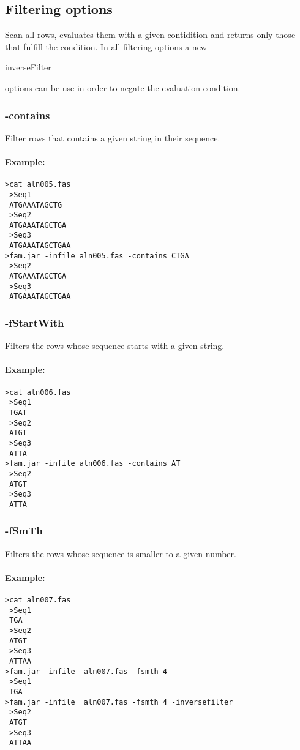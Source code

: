 \documentclass[a4paper, twoside,10pt]{article}
\begin{document}
\subsection{Filtering options}
Scan all rows, evaluates them with a given contidition and returns only those
that fulfill the condition. In all filtering options a new \begin{tt}inverseFilter
\end{tt} options can be use in order to negate the evaluation condition.

\subsubsection{-contains}
Filter rows that contains a given string in their sequence.
\paragraph{Example:}
\begin{verbatim}
>cat aln005.fas
 >Seq1
 ATGAAATAGCTG
 >Seq2
 ATGAAATAGCTGA
 >Seq3
 ATGAAATAGCTGAA
>fam.jar -infile aln005.fas -contains CTGA
 >Seq2
 ATGAAATAGCTGA
 >Seq3
 ATGAAATAGCTGAA
\end{verbatim}

\subsubsection{-fStartWith}
Filters the rows whose sequence starts with a given string.
\paragraph{Example:}
\begin{verbatim}
>cat aln006.fas
 >Seq1
 TGAT
 >Seq2
 ATGT
 >Seq3
 ATTA
>fam.jar -infile aln006.fas -contains AT
 >Seq2
 ATGT
 >Seq3
 ATTA
\end{verbatim}

\subsubsection{-fSmTh}
Filters the rows whose sequence is smaller to a given number.
\paragraph{Example:}
\begin{verbatim}
>cat aln007.fas
 >Seq1
 TGA
 >Seq2
 ATGT
 >Seq3
 ATTAA
>fam.jar -infile  aln007.fas -fsmth 4 
 >Seq1
 TGA
>fam.jar -infile  aln007.fas -fsmth 4 -inversefilter
 >Seq2
 ATGT
 >Seq3
 ATTAA
\end{verbatim}
\end{document}
